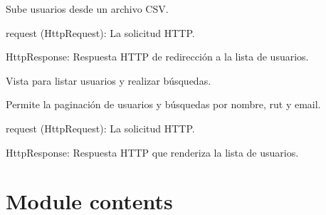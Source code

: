 \documentclass[letterpaper,10pt,spanish]{sphinxmanual}
\begin{document}
\begin{fulllineitems}
\label{\detokenize{modules/appusuarios:appusuarios.views.subir_usuarios}}
\pysigstartsignatures
{}
\pysigstopsignatures
\sphinxAtStartPar
Sube usuarios desde un archivo CSV.
\begin{description}
\sphinxAtStartPar
request (HttpRequest): La solicitud HTTP.

\sphinxAtStartPar
HttpResponse: Respuesta HTTP de redirección a la lista de usuarios.

\end{description}

\end{fulllineitems}


\begin{fulllineitems}
\label{\detokenize{modules/appusuarios:appusuarios.views.usuarios}}
\pysigstartsignatures
{}
\pysigstopsignatures
\sphinxAtStartPar
Vista para listar usuarios y realizar búsquedas.

\sphinxAtStartPar
Permite la paginación de usuarios y búsquedas por nombre, rut y email.
\begin{description}
\sphinxAtStartPar
request (HttpRequest): La solicitud HTTP.

\sphinxAtStartPar
HttpResponse: Respuesta HTTP que renderiza la lista de usuarios.

\end{description}

\end{fulllineitems}



\section{Module contents}
\label{\detokenize{modules/appusuarios:module-appusuarios}}\label{\detokenize{modules/appusuarios:module-contents}}
\sphinxstepscope
\end{document}
